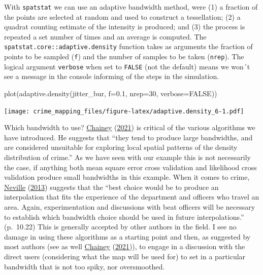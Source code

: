 \documentclass[
  krantz2]{krantz}
\makeatletter
\newenvironment{Shaded}{\begin{snugshade}}{\end{snugshade}}
\newcommand{\AttributeTok}[1]{\textcolor[rgb]{0.61,0.61,0.61}{#1}}
\newcommand{\ConstantTok}[1]{\textcolor[rgb]{0,0,0}{#1}}
\newcommand{\DecValTok}[1]{\textcolor[rgb]{0.06,0.06,0.06}{#1}}
\newcommand{\FloatTok}[1]{\textcolor[rgb]{0.06,0.06,0.06}{#1}}
\newcommand{\FunctionTok}[1]{\textcolor[rgb]{0,0,0}{#1}}
\newcommand{\NormalTok}[1]{#1}
\newenvironment{kframe}{%
\medskip{}
\setlength{\fboxsep}{.8em}
 \def\at@end@of@kframe{}%
 \ifinner\ifhmode%
  \def\at@end@of@kframe{\end{minipage}}%
  \begin{minipage}{\columnwidth}%
 \fi\fi%
 \def\FrameCommand##1{\hskip\@totalleftmargin \hskip-\fboxsep
 \colorbox{shadecolor}{##1}\hskip-\fboxsep
     \hskip-\linewidth \hskip-\@totalleftmargin \hskip\columnwidth}%
 \MakeFramed {\advance\hsize-\width
   \@totalleftmargin\z@ \linewidth\hsize
   \@setminipage}}%
 {\par\unskip\endMakeFramed%
 \at@end@of@kframe}
\renewenvironment{Shaded}{\begin{kframe}}{\end{kframe}}
\makeatother
\begin{document}
With \texttt{spatstat} we can use an adaptive bandwidth method, were (1) a fraction of the points are selected at random and used to construct a tessellation; (2) a quadrat counting estimate of the intensity is produced; and (3) the process is repeated a set number of times and an average is computed. The \texttt{spatstat.core::adaptive.density} function takes as arguments the fraction of points to be sampled (\texttt{f}) and the number of samples to be taken (\texttt{nrep}). The logical argument \texttt{verbose} when set to \texttt{FALSE} (not the default) means we won´t see a message in the console informing of the steps in the simulation.

\begin{Shaded}
\begin{Highlighting}[]
\FunctionTok{plot}\NormalTok{(}\FunctionTok{adaptive.density}\NormalTok{(jitter\_bur, }\AttributeTok{f=}\FloatTok{0.1}\NormalTok{, }\AttributeTok{nrep=}\DecValTok{30}\NormalTok{, }\AttributeTok{verbose=}\ConstantTok{FALSE}\NormalTok{))}
\end{Highlighting}
\end{Shaded}

\texttt{[image: crime\_mapping\_files/figure-latex/adaptive.density\_6-1.pdf]}

Which bandwidth to use? \protect\hyperlink{ref-Chainey_2021}{Chainey} (\protect\hyperlink{ref-Chainey_2021}{2021}) is critical of the various algorithms we have introduced. He suggests that ``they tend to produce large bandwidths, and are considered unsuitable for exploring local spatial patterns of the density distribution of crime.'' As we have seen with our example this is not necessarily the case, if anything both mean square error cross validation and likelihood cross validation produce small bandwidths in this example. When it comes to crime, \protect\hyperlink{ref-Neville_2013}{Neville} (\protect\hyperlink{ref-Neville_2013}{2013}) suggests that the ``best choice would be to produce an interpolation that fits the experience of the department and officers who travel an area. Again, experimentation and discussions with beat officers will be necessary to establish which bandwidth choice should be used in future interpolations.'' (p.~10.22) This is generally accepted by other authors in the field. I see no damage in using these algorithms as a starting point and then, as suggested by most authors (see as well \protect\hyperlink{ref-Chainey_2021}{Chainey} (\protect\hyperlink{ref-Chainey_2021}{2021})), to engage in a discussion with the direct users (considering what the map will be used for) to set in a particular bandwidth that is not too spiky, nor oversmoothed.
\end{document}
